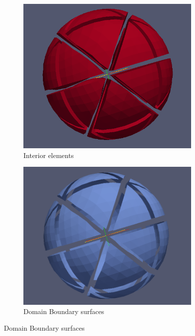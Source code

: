 \begin{figure}[H]
	\begin{subfigure}[b]{0.30\textwidth} \hspace{4mm} \includegraphics[scale=0.22]{images/32-inter} \captionsetup{width=0.8\textwidth} \caption{ Interior elements } \end{subfigure}
	\begin{subfigure}[b]{0.30\textwidth} \hspace{4mm} \includegraphics[scale=0.18]{images/32-db}    \captionsetup{width=0.8\textwidth} \caption{ Domain Boundary surfaces} \end{subfigure}

\end{figure}

